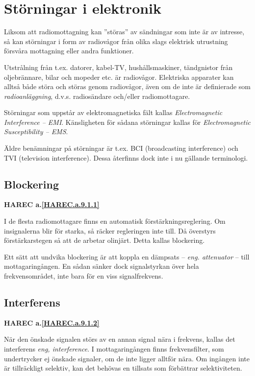 \section{Störningar i elektronik}

Liksom att radiomottagning kan ''störas'' av sändningar som inte är av
intresse, så kan störningar i form av radiovågor från olika slags
elektrisk utrustning försvåra mottagning eller andra funktioner.

Utstrålning från t.ex. datorer, kabel-TV, hushållsmaskiner,
tändgnistor från oljebrännare, bilar och mopeder etc. är radiovågor.
Elektriska apparater kan alltså både störa och störas genom
radiovågor, även om de inte är definierade som \emph{radioanläggning},
d.v.s. radiosändare och/eller radiomottagare.

Störningar som uppstår av elektromagnetiska fält kallas
\emph{Electromagnetic Interference -- EMI}. Känsligheten för sådana
störningar kallas för \emph{Electromagnetic Susceptibility -- EMS}.

Äldre benämningar på störningar är t.ex. BCI (broadcasting interference) och
TVI (television interference). Dessa återfinns dock inte i nu gällande
terminologi.

\subsection{Blockering}
\textbf{
HAREC a.\ref{HAREC.a.9.1.1}\label{myHAREC.a.9.1.1}
}

I de flesta radiomottagare finns en automatisk förstärkningsreglering. Om
insignalerna blir för starka, så räcker regleringen inte till. Då överstyrs
förstärkarstegen så att de arbetar olinjärt. Detta kallas blockering.

Ett sätt att undvika blockering är att koppla en dämpsats -- \emph{eng.
attenuator} -- till mottagaringången. En sådan sänker dock signalstyrkan
över hela frekvensområdet, inte bara för en viss signalfrekvens.

\subsection{Interferens}
\textbf{
HAREC a.\ref{HAREC.a.9.1.2}\label{myHAREC.a.9.1.2}
}

När den önskade signalen störs av en annan signal nära i frekvens, kallas det
interferens \emph{eng, interference}. I mottagaringången finns frekvensfilter,
som undertrycker ej önskade signaler, om de inte ligger alltför nära. Om
ingången inte är tillräckligt selektiv, kan det behövas en tillsats som
förbättrar selektiviteten.

